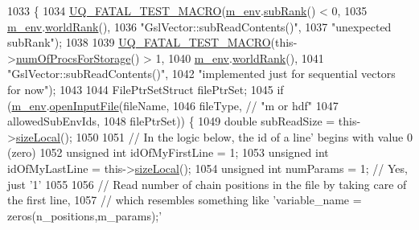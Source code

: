 \begin{DoxyCode}
1033 \{
1034   \hyperlink{_defines_8h_a56d63d18d0a6d45757de47fcc06f574d}{UQ\_FATAL\_TEST\_MACRO}(\hyperlink{class_q_u_e_s_o_1_1_vector_ae7615172bb1e54339151d3f3d71a0344}{m\_env}.\hyperlink{class_q_u_e_s_o_1_1_base_environment_a172d52f993f1322ed45aaddf71518dbb}{subRank}() < 0,
1035                       \hyperlink{class_q_u_e_s_o_1_1_vector_ae7615172bb1e54339151d3f3d71a0344}{m\_env}.\hyperlink{class_q_u_e_s_o_1_1_base_environment_a78b57112bbd0e6dd0e8afec00b40ffa7}{worldRank}(),
1036                       \textcolor{stringliteral}{"GslVector::subReadContents()"},
1037                       \textcolor{stringliteral}{"unexpected subRank"});
1038 
1039   \hyperlink{_defines_8h_a56d63d18d0a6d45757de47fcc06f574d}{UQ\_FATAL\_TEST\_MACRO}(this->\hyperlink{class_q_u_e_s_o_1_1_vector_a4dab068a8b5cedef00b8520c4e106a2b}{numOfProcsForStorage}() > 1,
1040                       \hyperlink{class_q_u_e_s_o_1_1_vector_ae7615172bb1e54339151d3f3d71a0344}{m\_env}.\hyperlink{class_q_u_e_s_o_1_1_base_environment_a78b57112bbd0e6dd0e8afec00b40ffa7}{worldRank}(),
1041                       \textcolor{stringliteral}{"GslVector::subReadContents()"},
1042                       \textcolor{stringliteral}{"implemented just for sequential vectors for now"});
1043 
1044   FilePtrSetStruct filePtrSet;
1045   \textcolor{keywordflow}{if} (\hyperlink{class_q_u_e_s_o_1_1_vector_ae7615172bb1e54339151d3f3d71a0344}{m\_env}.\hyperlink{class_q_u_e_s_o_1_1_base_environment_a8a3f76733a31991a1ed9a942feb2dc3c}{openInputFile}(fileName,
1046                           fileType, \textcolor{comment}{// "m or hdf"}
1047                           allowedSubEnvIds,
1048                           filePtrSet)) \{
1049     \textcolor{keywordtype}{double} subReadSize = this->\hyperlink{class_q_u_e_s_o_1_1_gsl_vector_ace6fb1739b7cf6456b3dcde84c766fb3}{sizeLocal}();
1050 
1051     \textcolor{comment}{// In the logic below, the id of a line' begins with value 0 (zero)}
1052     \textcolor{keywordtype}{unsigned} \textcolor{keywordtype}{int} idOfMyFirstLine = 1;
1053     \textcolor{keywordtype}{unsigned} \textcolor{keywordtype}{int} idOfMyLastLine = this->\hyperlink{class_q_u_e_s_o_1_1_gsl_vector_ace6fb1739b7cf6456b3dcde84c766fb3}{sizeLocal}();
1054     \textcolor{keywordtype}{unsigned} \textcolor{keywordtype}{int} numParams = 1; \textcolor{comment}{// Yes, just '1'}
1055 
1056     \textcolor{comment}{// Read number of chain positions in the file by taking care of the first line,}
1057     \textcolor{comment}{// which resembles something like 'variable\_name = zeros(n\_positions,m\_params);'}

\end{DoxyCode}
